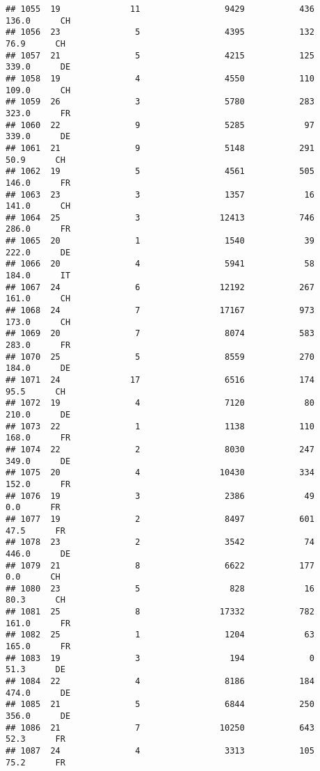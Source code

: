 \documentclass[
]{article}
\begin{document}
\begin{verbatim}
## 1055  19              11                 9429           436    136.0      CH
## 1056  23               5                 4395           132     76.9      CH
## 1057  21               5                 4215           125    339.0      DE
## 1058  19               4                 4550           110    109.0      CH
## 1059  26               3                 5780           283    323.0      FR
## 1060  22               9                 5285            97    339.0      DE
## 1061  21               9                 5148           291     50.9      CH
## 1062  19               5                 4561           505    146.0      FR
## 1063  23               3                 1357            16    141.0      CH
## 1064  25               3                12413           746    286.0      FR
## 1065  20               1                 1540            39    222.0      DE
## 1066  20               4                 5941            58    184.0      IT
## 1067  24               6                12192           267    161.0      CH
## 1068  24               7                17167           973    173.0      CH
## 1069  20               7                 8074           583    283.0      FR
## 1070  25               5                 8559           270    184.0      DE
## 1071  24              17                 6516           174     95.5      CH
## 1072  19               4                 7120            80    210.0      DE
## 1073  22               1                 1138           110    168.0      FR
## 1074  22               2                 8030           247    349.0      DE
## 1075  20               4                10430           334    152.0      FR
## 1076  19               3                 2386            49      0.0      FR
## 1077  19               2                 8497           601     47.5      FR
## 1078  23               2                 3542            74    446.0      DE
## 1079  21               8                 6622           177      0.0      CH
## 1080  23               5                  828            16     80.3      CH
## 1081  25               8                17332           782    161.0      FR
## 1082  25               1                 1204            63    165.0      FR
## 1083  19               3                  194             0     51.3      DE
## 1084  22               4                 8186           184    474.0      DE
## 1085  21               5                 6844           250    356.0      DE
## 1086  21               7                10250           643     52.3      FR
## 1087  24               4                 3313           105     75.2      FR

\end{verbatim}
\end{document}
